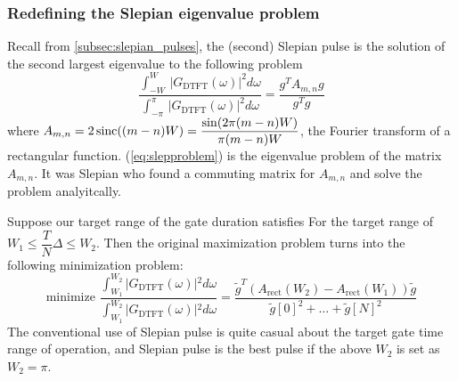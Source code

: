 \subsubsection{Redefining the Slepian eigenvalue problem}
Recall from \ref{subsec:slepian_pulses},
the (second) Slepian pulse is the solution of the second largest eigenvalue to the following problem
\begin{equation}
  \dfrac{\int_{-W}^{W}\,|G_{\text{DTFT}}(\omega)|^2 d\omega}
  {\int_{-\pi}^{\pi}\,|G_{\text{DTFT}}(\omega)|^2 d\omega} = \dfrac{g^TA_{m,n}g}{g^Tg} \label{eq:slepproblem}
\end{equation}
where $A_{m,n} = 2\operatorname{sinc}((m-n)W) = \dfrac{\sin(2\pi(m-n)W)}{\pi(m-n)W}$, the Fourier transform of a rectangular function.
(\ref{eq:slepproblem}) is the eigenvalue problem of the matrix $A_{m,n}$. It was Slepian who found a commuting
matrix for $A_{m,n}$ and solve the problem analyitcally.

Suppose our target range of the gate duration satisfies For the target range of $W_1\leq \dfrac{T}{N}  \Delta \leq W_2$.
Then the original maximization problem turns into the following minimization problem:
$$\text{minimize } \frac{\int_{W_1}^{W_2} \vert{}G_{\text{DTFT}}(\omega)\vert{}^2 d\omega}{\int_{W_1}^{W_2} \vert{}G_{\text{DTFT}}(\omega)\vert{}^2 d\omega} = \frac{\tilde{g}^T (A_{\text{rect}}(W_2) - A_{\text{rect}}(W_1)) \tilde{g}}{\tilde{g}[0]^2 + \dots + \tilde{g}[N]^2}$$
The conventional use of Slepian pulse is quite casual about the target gate time range of operation, and Slepian pulse
is the best pulse if the above $W_2$ is set as $W_2=\pi$.

